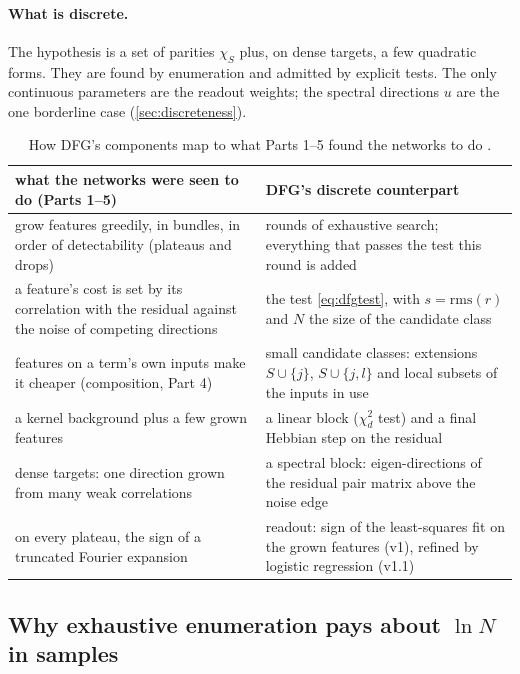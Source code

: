\paragraph{What is discrete.} The hypothesis is a set of parities $\chi_S$ plus, on dense targets, a few quadratic forms. They are found by enumeration and admitted by explicit tests. The only continuous parameters are the readout weights; the spectral directions $u$ are the one borderline case (\cref{sec:discreteness}).

\begin{table}[t]
\centering\footnotesize\renewcommand{\arraystretch}{1.25}
\begin{tabularx}{\linewidth}{>{\raggedright\arraybackslash}X>{\raggedright\arraybackslash}X}
\toprule
what the networks were seen to do (Parts 1--5) & DFG's discrete counterpart\\
\midrule
grow features greedily, in bundles, in order of detectability (plateaus and drops) & rounds of exhaustive search; everything that passes the test this round is added\\
a feature's cost is set by its correlation with the residual against the noise of competing directions & the test \eqref{eq:dfgtest}, with $s=\mathrm{rms}(r)$ and $N$ the size of the candidate class\\
features on a term's own inputs make it cheaper (composition, Part 4) & small candidate classes: extensions $S\cup\{j\}$, $S\cup\{j,l\}$ and local subsets of the inputs in use\\
a kernel background plus a few grown features & a linear block ($\chi^2_d$ test) and a final Hebbian step on the residual\\
dense targets: one direction grown from many weak correlations & a spectral block: eigen-directions of the residual pair matrix above the noise edge\\
on every plateau, the sign of a truncated Fourier expansion & readout: sign of the least-squares fit on the grown features (v1), refined by logistic regression (v1.1)\\
\bottomrule
\end{tabularx}
\caption{How DFG's components map to what Parts 1--5 found the networks to do \cite{gdcircuit2026}.}
\label{tab:dfgmap}
\end{table}

\subsection{Why exhaustive enumeration pays about \texorpdfstring{$\ln N$}{ln N} in samples}\label{sec:lnN}

